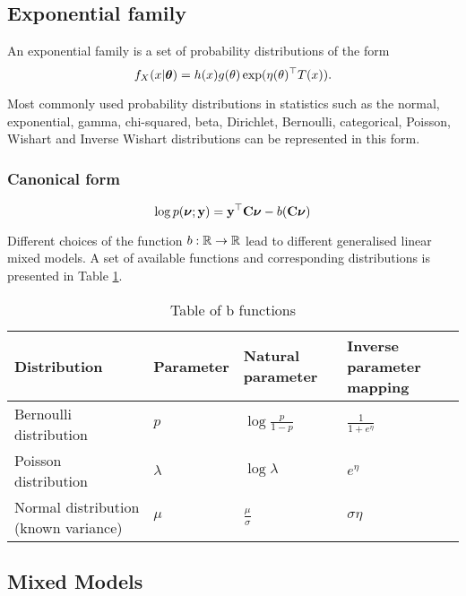 \documentclass{amsart}[12pt]
\begin{document}
\subsection{Exponential family}

An exponential family is a set of probability distributions of the form
\[
	f_X(x|{\boldsymbol \theta}) = h(x) g(\theta) \exp(\eta(\theta)^\top T(x)).
\]

Most commonly used probability distributions in statistics such as the normal, exponential, gamma,
chi-squared, beta, Dirichlet, Bernoulli, categorical, Poisson, Wishart and Inverse Wishart distributions can
be represented in this form.

\subsubsection{Canonical form}
\[
	\log p({\boldsymbol \nu}; {\bf y}) = {\bf y}^\top {\bf C} {\boldsymbol\nu} - b({\bf C} {\boldsymbol \nu})
\]

Different choices of the function $b:{\mathbb{R}} \to {\mathbb{R}}$ lead to different generalised linear mixed models. A set
of available functions and corresponding distributions is presented in Table \ref{tab:b_functions}.

\begin{table}
	\caption{Table of b functions}
	\label{tab:b_functions}
	\begin{tabular}{|l|lll|}
		\hline
		Distribution                         & Parameter & Natural parameter       & Inverse parameter mapping \\
		\hline
		Bernoulli distribution               & $p$       & $\log{\frac{p}{1 - p}}$ & $\frac{1}{1 + e^\eta}$    \\
		Poisson distribution                 & $\lambda$ & $\log \lambda$          & $e^\eta$                  \\
		Normal distribution (known variance) & $\mu$     & $\frac{\mu}{\sigma}$    & $\sigma \eta$             \\
		\hline
	\end{tabular}
\end{table}

\subsection{Mixed Models}
\end{document}
